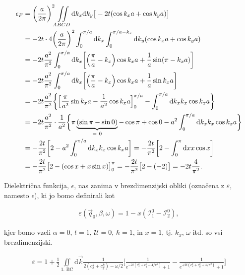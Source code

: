 \documentclass[a4paper, 12pt]{article}
\newcommand{\vq}{
	\ensuremath{\vec{q}}
}
\newcommand{\w}{
	\ensuremath{\omega}
}
\newcommand{\e}{
	\ensuremath{\epsilon}
}
\newcommand{\vk}{
	\ensuremath{\vec{k}}
}
\newcommand{\dd}{
	\ensuremath{\text{d}}
}
\newcommand{\I}{
	\ensuremath{\mathcal{I}}
}
\begin{document}
\begin{align}
	\e_F &= \bigg(\frac{a}{2\pi}\bigg)^2 \iint\limits_{ABCD} \dd k_x \dd k_y \big[-2t (\cos k_x a + \cos k_y a)
		\big] \notag \\
	&= -2t \cdot 4 \bigg(\frac{a}{2\pi}\bigg)^2 \int_0^{\pi/a} \dd k_x \int_0^{\pi/a - k_x} \dd k_y (\cos k_x a +
		\cos k_y a) \notag \\
	&= -2t \frac{a^2}{\pi^2} \int_0^{\pi/a} \dd k_x \bigg[\Big(\frac{\pi}{a} - k_x\Big)\cos k_x a +
		\frac{1}{a}\sin(\pi - k_x a)\bigg] \notag \\
	&= -2t \frac{a^2}{\pi^2} \int_0^{\pi/a} \dd k_x \bigg[\Big(\frac{\pi}{a} - k_x\Big)\cos k_x a +
		\frac{1}{a}\sin k_x a \bigg] \notag \\
	&= -2t \frac{a^2}{\pi^2} \bigg\{\Big[\frac{\pi}{a^2}\sin k_x a - \frac{1}{a^2}\cos k_x a\Big]_0^{\pi/a} -
		\int_0^{\pi/a} \dd k_x k_x \cos k_x a\bigg\} \notag \\
	&= -2t \frac{a^2}{\pi^2} \cdot \frac{1}{a^2} \bigg\{\pi \underbrace{(\sin\pi - \sin 0)}_{=\ 0} - \cos\pi + \cos 0 - a^2
		\int_0^{\pi/a} \dd k_x k_x \cos k_x a\bigg\} \notag \\
	&= -\frac{2t}{\pi^2} \bigg[2 - a^2 \int_0^{\pi/a} \dd k_x k_x \cos k_x a\bigg] = -\frac{2t}{\pi^2}
		\bigg[2 - \int_0^\pi \dd x x \cos x\bigg] \notag \\
	&= -\frac{2t}{\pi^2}\big[2 - (\cos x + x\sin x)\big]_0^\pi = -\frac{2t}{\pi^2} \big[2 - (-2)\big] =
		-2t \frac{4}{\pi^2}.
\end{align}

Dielektri\v cna funkcija, $\e$, nas zanima v brezdimenzijski obliki (ozna\v cena z $\varepsilon$, namesto $\e$), ki jo bomo
definirali kot

\begin{align}
	\varepsilon (\vq_0, \beta, \w) = 1 - x (\I^0_1 - \I^0_2),
\end{align}

kjer bomo vzeli $\alpha = 0$, $t = 1$, $\mathcal{U} = 0$, $\hbar = 1$, in $x = 1$, tj. $k_x$, $\w$ itd. so vsi brezdimenzijski.

\begin{align}
	\varepsilon = 1 + \frac{1}{2}\iint\limits_\text{1. BC} \dd \vk \frac{1}{2(c_x^k + c_y^k) - \w/2}
		\bigg[\frac{1}{e^{-2t(c_x^k + c_y^k - 4/\pi^2)} + 1} - \frac{1}{e^{+2t(c_x^k + c_y^k + 4/\pi^2)} + 1}\bigg]
\end{align}
\end{document}
